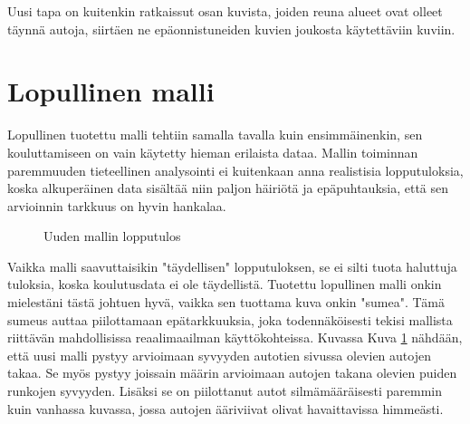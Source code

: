 Uusi tapa on kuitenkin ratkaissut osan kuvista, joiden reuna alueet ovat olleet täynnä autoja, siirtäen ne epäonnistuneiden kuvien joukosta käytettäviin kuviin.

\section{Lopullinen malli}

Lopullinen tuotettu malli tehtiin samalla tavalla kuin ensimmäinenkin, 
sen kouluttamiseen on vain käytetty hieman erilaista dataa.
Mallin toiminnan paremmuuden tieteellinen analysointi ei kuitenkaan anna realistisia lopputuloksia, 
koska alkuperäinen data sisältää niin paljon häiriötä ja epäpuhtauksia, että sen arvioinnin tarkkuus on hyvin hankalaa.

\begin{figure}[h]
\centering
{}
\caption{Uuden mallin lopputulos}
\label{fig:uusi_malli}
\end{figure}


Vaikka malli saavuttaisikin "täydellisen" lopputuloksen, se ei silti tuota haluttuja tuloksia, koska koulutusdata ei ole täydellistä.
Tuotettu lopullinen malli onkin mielestäni tästä johtuen hyvä, vaikka sen tuottama kuva onkin "sumea". 
Tämä sumeus auttaa piilottamaan epätarkkuuksia, joka todennäköisesti tekisi mallista riittävän mahdollisissa reaalimaailman käyttökohteissa.
Kuvassa Kuva \ref{fig:uusi_malli} nähdään, että uusi malli pystyy arvioimaan syvyyden autotien sivussa olevien autojen takaa. 
Se myös pystyy joissain määrin arvioimaan autojen takana olevien puiden runkojen syvyyden. 
Lisäksi se on piilottanut autot silmämääräisesti paremmin kuin vanhassa kuvassa, jossa autojen ääriviivat olivat havaittavissa himmeästi.
